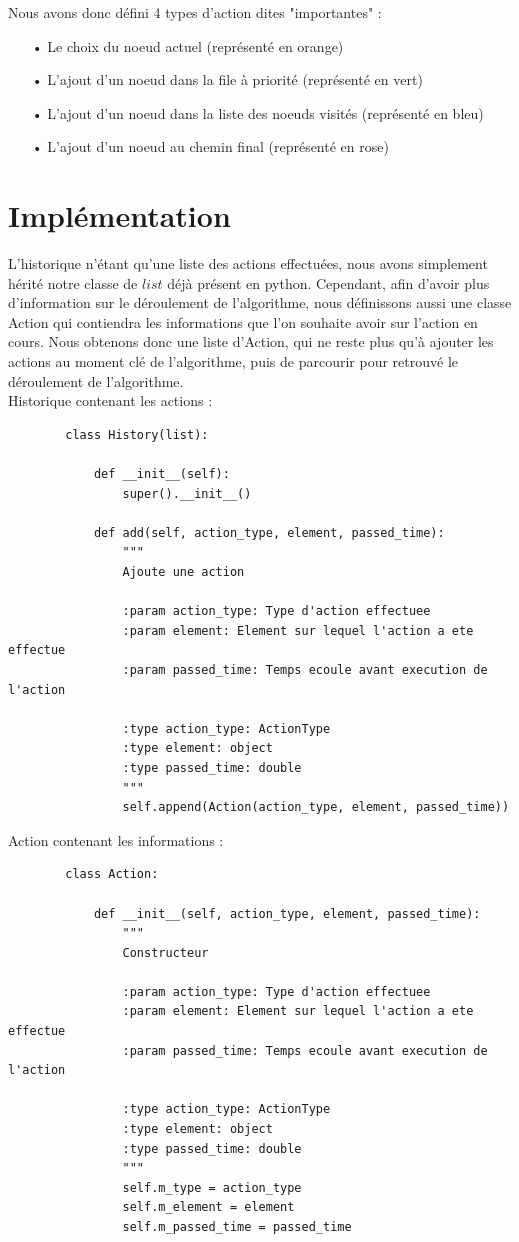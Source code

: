\documentclass{report}
\begin{document}
	Nous avons donc défini 4 types d'action dites "importantes" :
	\begin{itemize}
		\item[•] Le choix du noeud actuel (représenté en orange)
		\item[•] L'ajout d'un noeud dans la file à priorité (représenté en vert)
		\item[•] L'ajout d'un noeud dans la liste des noeuds visités (représenté en bleu)
		\item[•] L'ajout d'un noeud au chemin final (représenté en rose)
	\end{itemize}
	\section{Implémentation}
	L'historique n'étant qu'une liste des actions effectuées, nous avons simplement hérité notre classe de $list$ déjà présent en python.
	Cependant, afin d'avoir plus d'information sur le déroulement de l'algorithme, nous définissons aussi une classe Action qui contiendra les informations que l'on souhaite avoir sur l'action en cours.
	Nous obtenons donc une liste d'Action, qui ne reste plus qu'à ajouter les actions au moment clé de l'algorithme, puis de parcourir pour retrouvé le déroulement de l'algorithme.\\
	
	Historique contenant les actions :
	\begin{lstlisting}
		class History(list):

    		def __init__(self):
        		super().__init__()

    		def add(self, action_type, element, passed_time):
        		"""
        		Ajoute une action

        		:param action_type: Type d'action effectuee
        		:param element: Element sur lequel l'action a ete effectue
        		:param passed_time: Temps ecoule avant execution de l'action

        		:type action_type: ActionType
        		:type element: object
        		:type passed_time: double
        		"""
        		self.append(Action(action_type, element, passed_time))
	\end{lstlisting}
	\newpage
	Action contenant les informations :
	\begin{lstlisting}
		class Action:

    		def __init__(self, action_type, element, passed_time):
        		"""
        		Constructeur

        		:param action_type: Type d'action effectuee
        		:param element: Element sur lequel l'action a ete effectue
        		:param passed_time: Temps ecoule avant execution de l'action

        		:type action_type: ActionType
        		:type element: object
        		:type passed_time: double
        		"""
        		self.m_type = action_type
        		self.m_element = element
        		self.m_passed_time = passed_time
	\end{lstlisting}
	
\end{document}
